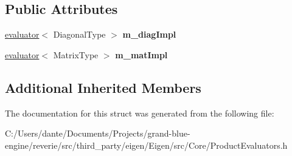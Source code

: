 \subsection*{Public Attributes}
\begin{DoxyCompactItemize}
\item 
\mbox{\label{struct_eigen_1_1internal_1_1product__evaluator_3_01_product_3_01_lhs_00_01_rhs_00_01_product_kinb2964e3ecd5359c634047e003305b765_aac89e831a382ebe6172a2cc32e3159ac}} 
\mbox{\hyperlink{struct_eigen_1_1internal_1_1evaluator}{evaluator}}$<$ Diagonal\+Type $>$ {\bfseries m\+\_\+diag\+Impl}
\item 
\mbox{\label{struct_eigen_1_1internal_1_1product__evaluator_3_01_product_3_01_lhs_00_01_rhs_00_01_product_kinb2964e3ecd5359c634047e003305b765_ab40d6e41275ebc97d46700e5b2f562ce}} 
\mbox{\hyperlink{struct_eigen_1_1internal_1_1evaluator}{evaluator}}$<$ Matrix\+Type $>$ {\bfseries m\+\_\+mat\+Impl}
\end{DoxyCompactItemize}
\subsection*{Additional Inherited Members}


The documentation for this struct was generated from the following file\+:\begin{DoxyCompactItemize}
\item 
C\+:/\+Users/dante/\+Documents/\+Projects/grand-\/blue-\/engine/reverie/src/third\+\_\+party/eigen/\+Eigen/src/\+Core/Product\+Evaluators.\+h\end{DoxyCompactItemize}
